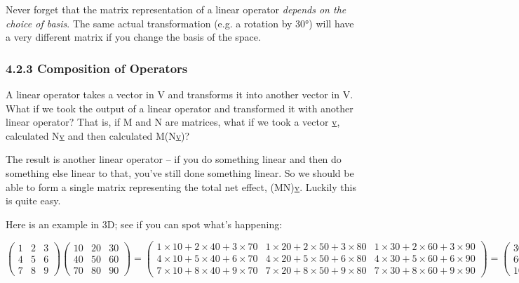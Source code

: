 \documentclass[oneside,english]{amsbook}
\numberwithin{section}{chapter}
\theoremstyle{plain}
\theoremstyle{definition}
\begin{document}
Never forget that the matrix representation of a linear operator
\emph{depends on the choice of basis}. The same actual transformation
(e.g. a rotation by 30°) will have a very different matrix if you change
the basis of the space.

\subsubsection{4.2.3 Composition of
	Operators}\label{composition-of-operators}

A linear operator takes a vector in V and transforms it into another
vector in V. What if we took the output of a linear operator and
transformed it with another linear operator? That is, if M and N are
matrices, what if we took a vector \ul{v}, calculated N\ul{v} and then
calculated M(N\ul{v})?

The result is another linear operator -- if you do something linear and
then do something else linear to that, you've still done something
linear. So we should be able to form a single matrix representing the
total net effect, (MN)\ul{v}. Luckily this is quite easy.

Here is an example in 3D; see if you can spot what's happening:

\[\begin{pmatrix}
	1 & 2 & 3 \\
	4 & 5 & 6 \\
	7 & 8 & 9
\end{pmatrix}\begin{pmatrix}
	10 & 20 & 30 \\
	40 & 50 & 60 \\
	70 & 80 & 90
\end{pmatrix} = \begin{pmatrix}
	1 \times 10 + 2 \times 40 + 3 \times 70 & 1 \times 20 + 2 \times 50 + 3 \times 80 & 1 \times 30 + 2 \times 60 + 3 \times 90 \\
	4 \times 10 + 5 \times 40 + 6 \times 70 & 4 \times 20 + 5 \times 50 + 6 \times 80 & 4 \times 30 + 5 \times 60 + 6 \times 90 \\
	7 \times 10 + 8 \times 40 + 9 \times 70 & 7 \times 20 + 8 \times 50 + 9 \times 80 & 7 \times 30 + 8 \times 60 + 9 \times 90
\end{pmatrix} = \begin{pmatrix}
	300 & 360 & 420 \\
	660 & 810 & 960 \\
	1020 & 1260 & 1500
\end{pmatrix}\]
\end{document}
